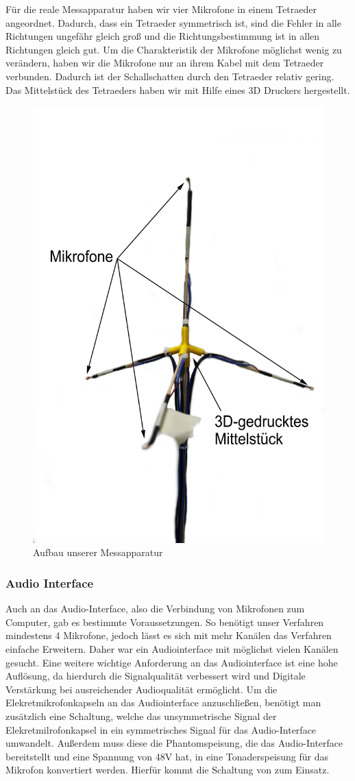 Für die reale Messapparatur haben wir vier Mikrofone in einem Tetraeder angeordnet. Dadurch, dass ein Tetraeder symmetrisch ist, sind die Fehler in alle Richtungen ungefähr gleich groß und die Richtungsbestimmung ist in allen Richtungen gleich gut. Um die Charakteristik der Mikrofone möglichst wenig zu verändern, haben wir die Mikrofone nur an ihrem Kabel mit dem Tetraeder verbunden. Dadurch ist der Schallschatten durch den Tetraeder relativ gering. Das Mittelstück des Tetraeders haben wir mit Hilfe eines 3D Druckers hergestellt.
\begin{figure}[H]
  \begin{center}
    \includegraphics[width=0.35\linewidth]{img/tet}
  \end{center}
  \caption{Aufbau unserer Messapparatur}
\end{figure}
\subsubsection{Audio Interface}
Auch an das Audio-Interface, also die Verbindung von Mikrofonen zum Computer, gab es bestimmte Voraussetzungen. So benötigt unser Verfahren mindestens 4 Mikrofone, jedoch lässt es sich mit mehr Kanälen das Verfahren einfache Erweitern. Daher war ein Audiointerface mit möglichst vielen Kanälen gesucht. Eine weitere wichtige Anforderung an das Audiointerface ist eine hohe Auflösung, da hierdurch die Signalqualität verbessert wird und Digitale Verstärkung bei ausreichender Audioqualität ermöglicht. Um die Elekretmikrofonkapseln an das Audiointerface anzuschließen, benötigt man zusätzlich eine Schaltung, welche das unsymmetrische Signal der Elekretmilrofonkapsel in ein symmetrisches Signal für das Audio-Interface umwandelt. Außerdem muss diese die Phantomspeisung, die das Audio-Interface bereitstellt und eine Spannung von 48V hat, in eine Tonaderspeisung für das Mikrofon konvertiert werden. Hierfür kommt die Schaltung von \cite{Powering_microphones} zum Einsatz.

